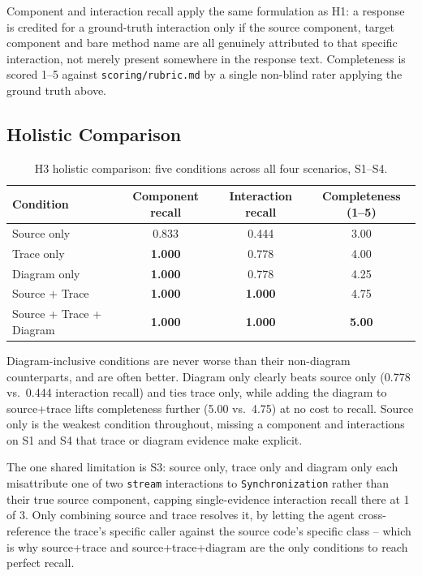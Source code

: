 Component and interaction recall apply the same formulation as H1: a
response is credited for a ground-truth interaction only if the source
component, target component and bare method name are all genuinely
attributed to that specific interaction, not merely present somewhere
in the response text. Completeness is scored 1--5 against
\texttt{scoring/rubric.md} by a single non-blind rater applying the
ground truth above.

\subsection{Holistic Comparison}
\label{sec:h3-holistic}

\begin{table}[htb]
\centering
\caption{H3 holistic comparison: five conditions across all four scenarios, S1--S4.}
\label{tab:h3-holistic}
\small
\begin{tabular}{@{} l c c c @{}}
\toprule
\textbf{Condition} & \textbf{Component recall} & \textbf{Interaction recall} & \textbf{Completeness (1--5)} \\
\midrule
Source only               & 0.833 & 0.444 & 3.00 \\
Trace only                 & \textbf{1.000} & 0.778 & 4.00 \\
Diagram only               & \textbf{1.000} & 0.778 & 4.25 \\
Source + Trace              & \textbf{1.000} & \textbf{1.000} & 4.75 \\
Source + Trace + Diagram    & \textbf{1.000} & \textbf{1.000} & \textbf{5.00} \\
\bottomrule
\end{tabular}
\end{table}

Diagram-inclusive conditions are never worse than their non-diagram
counterparts, and are often better. Diagram only clearly beats source
only (0.778 vs.\ 0.444 interaction recall) and ties trace only, while
adding the diagram to source+trace lifts completeness further (5.00
vs.\ 4.75) at no cost to recall. Source only is the weakest condition
throughout, missing a component and interactions on S1 and S4 that
trace or diagram evidence make explicit.

The one shared limitation is S3: source only, trace only and diagram
only each misattribute one of two \texttt{stream} interactions to
\texttt{Synchronization} rather than their true source component,
capping single-evidence interaction recall there at 1 of 3. Only
combining source and trace resolves it, by letting the agent
cross-reference the trace's specific caller against the source code's
specific class -- which is why source+trace and source+trace+diagram
are the only conditions to reach perfect recall.


